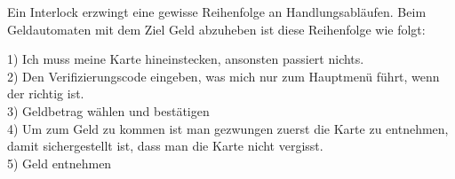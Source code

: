 Ein Interlock erzwingt eine gewisse Reihenfolge an Handlungsabläufen.
Beim Geldautomaten mit dem Ziel Geld abzuheben ist diese Reihenfolge wie folgt:

1) Ich muss meine Karte hineinstecken, ansonsten passiert nichts. \\
2) Den Verifizierungscode eingeben, was mich nur zum Hauptmenü führt, wenn der richtig ist. \\
3) Geldbetrag wählen und bestätigen \\
4) Um zum Geld zu kommen ist man gezwungen zuerst die Karte zu entnehmen, damit sichergestellt ist,
dass man die Karte nicht vergisst. \\
5) Geld entnehmen